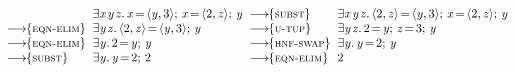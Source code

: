 \documentclass[acmsmall]{acmart}
\newcommand{\Varid}[1]{\mathit{#1}}
\begin{document}
\begin{center}
$
\begin{array}{@{}l@{\;\;}l@{\;\;}l@{\;\;}l@{}}
                         & \ensuremath{\exists\Varid{x}\hspace{0.1em}\Varid{y}\hspace{0.1em}\Varid{z}.\,\Varid{x}\hspace{-0.14em}=\hspace{-0.14em}\langle{}\Varid{y},\mathrm{3}\rangle;\,\Varid{x}\hspace{-0.14em}=\hspace{-0.14em}\langle{}\mathrm{2},\Varid{z}\rangle;\,\Varid{y}} &
\movestoR{subst}         & \ensuremath{\exists\Varid{x}\hspace{0.1em}\Varid{y}\hspace{0.1em}\Varid{z}.\,\langle{}\mathrm{2},\Varid{z}\rangle\hspace{-0.14em}=\hspace{-0.14em}\langle{}\Varid{y},\mathrm{3}\rangle;\,\Varid{x}\hspace{-0.14em}=\hspace{-0.14em}\langle{}\mathrm{2},\Varid{z}\rangle;\,\Varid{y}} \\
\movestoR{eqn-elim}      & \ensuremath{\exists\Varid{y}\hspace{0.1em}\Varid{z}.\,\langle{}\mathrm{2},\Varid{z}\rangle\hspace{-0.14em}=\hspace{-0.14em}\langle{}\Varid{y},\mathrm{3}\rangle;\,\Varid{y}} &
\movestoR{u-tup}         & \ensuremath{\exists\Varid{y}\hspace{0.1em}\Varid{z}.\,\mathrm{2}\hspace{-0.14em}=\hspace{-0.14em}\Varid{y};\,\Varid{z}\hspace{-0.14em}=\hspace{-0.14em}\mathrm{3};\,\Varid{y}} \\
\movestoR{eqn-elim}      & \ensuremath{\exists\Varid{y}.\,\mathrm{2}\hspace{-0.14em}=\hspace{-0.14em}\Varid{y};\,\Varid{y}} &
\movestoR{hnf-swap}      & \ensuremath{\exists\Varid{y}.\,\Varid{y}\hspace{-0.14em}=\hspace{-0.14em}\mathrm{2};\,\Varid{y}} \\
\movestoR{subst}         & \ensuremath{\exists\Varid{y}.\,\Varid{y}\hspace{-0.14em}=\hspace{-0.14em}\mathrm{2};\,\mathrm{2}} &
\movestoR{eqn-elim}      & \ensuremath{\mathrm{2}} \\
\end{array}
$
\end{center}
\end{document}
